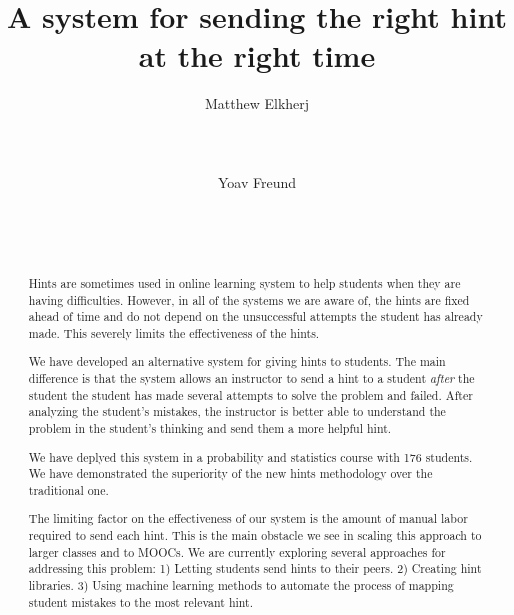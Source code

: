 \documentclass{sigchi}
\begin{document}
\title{A system for sending the right hint at the right time}

\author{
  \alignauthor Matthew Elkherj\\
    \\
    \\
    \\
  \alignauthor Yoav Freund\\
    \\
    \\
    \\
}

\maketitle

\begin{abstract}
Hints are sometimes used in online learning system to help students
when they are having difficulties. However, in all of the systems we
are aware of, the hints are fixed ahead of time and do not depend on
the unsuccessful attempts the student has already made. This severely
limits the effectiveness of the hints.

We have developed an alternative system for giving hints to
students. The main difference is that the system allows an instructor
to send a hint to a student {\em after} the student the student has
made several attempts to solve the problem and failed.  After
analyzing the student's mistakes, the instructor is better able to
understand the problem in the student's thinking and send them a more
helpful hint.

We have deplyed this system in a probability and statistics course
with 176 students. We have demonstrated the superiority of the new
hints methodology over the traditional one.

The limiting factor on the effectiveness of our system is the amount
of manual labor required to send each hint. This is the main obstacle
we see in scaling this approach to larger classes and to MOOCs. We
are currently exploring several approaches for addressing this
problem: 1) Letting students send hints to their peers. 2) Creating
hint libraries. 3) Using machine learning methods to automate
the process of mapping student mistakes to the most relevant hint.

\end{abstract}
\end{document}
